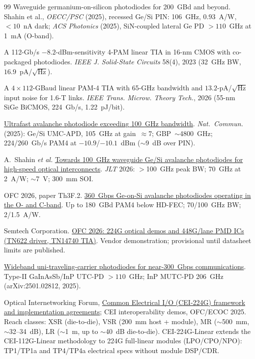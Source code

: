 \begin{thebibliography}{99}
Waveguide germanium-on-silicon photodiodes for 200~GBd and beyond.
\newblock Shahin et al., \emph{OECC/PSC} (2025), recessed Ge/Si PIN: 106~GHz, $0.93$~A/W, $<\!10$~nA dark;
\newblock \emph{ACS Photonics} (2025), SiN-coupled lateral Ge PD $>\!110$~GHz at 1~mA (O-band).

A 112-Gb/s $-8.2$-dBm-sensitivity 4-PAM linear TIA in 16-nm CMOS with co-packaged photodiodes.
\newblock \emph{IEEE J. Solid-State Circuits} 58(4), 2023 (32~GHz BW, $16.9$~pA/$\sqrt{\text{Hz}}$).

A $4\times112$-GBaud linear PAM-4 TIA with 65-GHz bandwidth and $13.2$-pA/$\sqrt{\text{Hz}}$ input noise for 1.6-T links.
\newblock \emph{IEEE Trans. Microw. Theory Tech.}, 2026 (55-nm SiGe BiCMOS, 224~Gb/s, 1.22~pJ/bit).

\href{https://doi.org/10.1038/s41467-025-66047-6}{Ultrafast avalanche photodiode exceeding 100~GHz bandwidth}.
\newblock \emph{Nat.\ Commun.} (2025): Ge/Si UMC-APD, 105~GHz at gain~$\approx$7; GBP~$\sim$4800~GHz;
224/260~Gb/s PAM4 at $-10.9$/$-10.1$~dBm ($\sim$9~dB over PIN).

A.~Shahin \emph{et al.}
\newblock \href{https://doi.org/10.1109/JLT.2026.3670103}{Towards 100~GHz waveguide Ge/Si avalanche photodiodes for high-speed optical interconnects}.
\newblock \emph{JLT} 2026: $>$100~GHz peak BW; 70~GHz at 2~A/W; $\sim$7~V; 300~mm SOI.

OFC 2026, paper Th3F.2.
\newblock \href{https://doi.org/10.1364/OFC.2026.Th3F.2}{360~Gbps Ge-on-Si avalanche photodiodes operating in the O- and C-band}.
\newblock Up to 180~GBd PAM4 below HD-FEC; 70/100~GHz BW; 2/1.5~A/W.

Semtech Corporation.
\newblock \href{https://www.semiconductor-today.com/news_items/2026/mar/semtech-160326.shtml}{OFC 2026: 224G optical demos and 448G/lane PMD ICs (TN622 driver, TN14740 TIA)}.
\newblock Vendor demonstration; provisional until datasheet limits are published.

\href{https://arxiv.org/abs/2501.02812}{Wideband uni-traveling-carrier photodiodes for near-300~Gbps communications}.
\newblock Type-II GaInAsSb/InP UTC-PD $>\!110$~GHz; InP MUTC-PD 206~GHz (arXiv:2501.02812, 2025).

Optical Internetworking Forum, \href{https://www.oiforum.com/technical-work/hot-topics/common-electrical-i-o-cei-224g/}{Common Electrical I/O (CEI-224G) framework and
implementation agreements}; CEI interoperability demos, OFC/ECOC 2025.
\newblock Reach classes: XSR (die-to-die), VSR (200~mm host + module), MR
($\sim$500~mm, $\sim$32--34~dB), LR ($\sim$1~m, up to $\sim$40~dB die-to-die).
CEI-224G-Linear extends the CEI-112G-Linear methodology to 224G full-linear
modules (LPO/CPO/NPO): TP1/TP1a and TP4/TP4a electrical specs without module
DSP/CDR.


\end{thebibliography}
